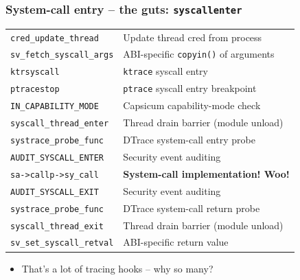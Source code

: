 \begin{frame}
  \frametitle{System-call entry -- the guts: \texttt{syscallenter}}

  \begin{tabular}{ll}
  \texttt{cred\_update\_thread} & Update thread cred from process \\

  \pause

  \texttt{sv\_fetch\_syscall\_args} & ABI-specific \texttt{copyin()} of
      arguments \\

  \pause

  \texttt{ktrsyscall} & \texttt{ktrace} syscall entry \\

  \pause

  \texttt{ptracestop} & \texttt{ptrace} syscall entry breakpoint \\

  \pause

  \texttt{IN\_CAPABILITY\_MODE} & Capsicum capability-mode check \\

  \pause

  \texttt{syscall\_thread\_enter} & Thread drain barrier (module unload) \\

  \pause

  \texttt{systrace\_probe\_func} & DTrace system-call entry probe \\

  \medskip
  \pause

  \texttt{AUDIT\_SYSCALL\_ENTER} & Security event auditing \\

  \medskip
  \pause

  \texttt{sa->callp->sy\_call} & \textbf{System-call implementation!  Woo!} \\

  \pause

  \texttt{AUDIT\_SYSCALL\_EXIT} & Security event auditing \\

  \pause

  \texttt{systrace\_probe\_func} & DTrace system-call return probe \\

  \pause

  \texttt{syscall\_thread\_exit} & Thread drain barrier (module unload) \\

  \pause

  \texttt{sv\_set\_syscall\_retval} & ABI-specific return value \\
  \end{tabular}

  \pause
  \begin{itemize}
    \item That's a lot of tracing hooks -- why so many?
  \end{itemize}
\end{frame}

